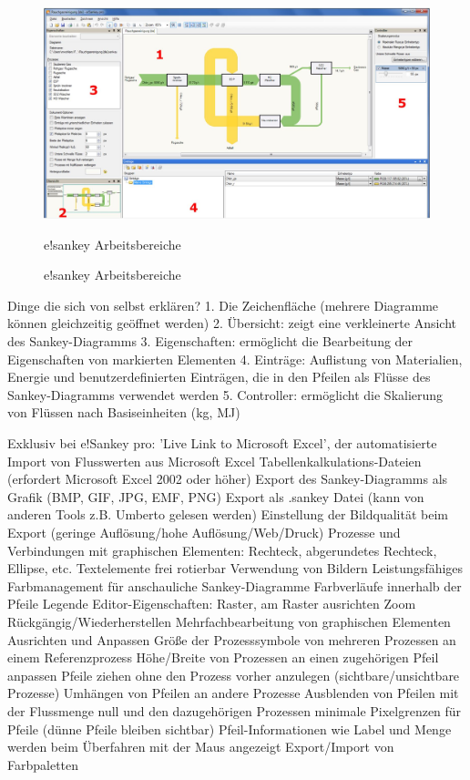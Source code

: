 \documentclass[a4paper, 12pt, twoside, BCOR=20mm, DIV=calc, abstracton, parskip=half*, toc=bibliography, toc=listof, headsepline, footsepline, headings=small, numbers=enddot]{scrreprt}
\begin{document}
\begin{figure}
\includegraphics{Bild/Esankey Arbeitsbereiche Rauchgas.JPG}
\caption{e!sankey Arbeitsbereiche}{e!sankey Arbeitsbereiche\cite{esankeyHandbuch032014}}
\end{figure}
Dinge die sich von selbst erklären?
	1. Die Zeichenfläche (mehrere Diagramme können gleichzeitig geöffnet werden) 
	2. Übersicht: zeigt eine verkleinerte Ansicht des Sankey-Diagramms 
	3. Eigenschaften: ermöglicht die Bearbeitung der Eigenschaften von markierten
	Elementen 
	4. Einträge: Auflistung von Materialien, Energie und benutzerdefinierten Einträgen,
	die in den Pfeilen als Flüsse des Sankey-Diagramms verwendet werden 
	5. Controller: ermöglicht die Skalierung von Flüssen nach Basiseinheiten (kg, MJ) 
	
	Exklusiv bei e!Sankey pro: 'Live Link to Microsoft Excel', der automatisierte Import von Flusswerten aus Microsoft Excel Tabellenkalkulations-Dateien (erfordert Microsoft Excel 2002 oder höher)
	Export des Sankey-Diagramms als Grafik (BMP, GIF, JPG, EMF, PNG)
	Export als .sankey Datei (kann von anderen Tools z.B. Umberto gelesen werden)
	Einstellung der Bildqualität beim Export (geringe Auflösung/hohe Auflösung/Web/Druck)
	Prozesse und Verbindungen mit graphischen Elementen: Rechteck, abgerundetes Rechteck, Ellipse, etc.
	Textelemente frei rotierbar
	Verwendung von Bildern
	Leistungsfähiges Farbmanagement für anschauliche Sankey-Diagramme
	Farbverläufe innerhalb der Pfeile
	Legende
	Editor-Eigenschaften: Raster, am Raster ausrichten
	Zoom
	Rückgängig/Wiederherstellen
	Mehrfachbearbeitung von graphischen Elementen
	Ausrichten und Anpassen Größe der Prozesssymbole von mehreren Prozessen an einem Referenzprozess
	Höhe/Breite von Prozessen an einen zugehörigen Pfeil anpassen
	Pfeile ziehen ohne den Prozess vorher anzulegen (sichtbare/unsichtbare Prozesse)
	Umhängen von Pfeilen an andere Prozesse
	Ausblenden von Pfeilen mit der Flussmenge null und den dazugehörigen Prozessen
	minimale Pixelgrenzen für Pfeile (dünne Pfeile bleiben sichtbar)
	Pfeil-Informationen wie Label und Menge werden beim Überfahren mit der Maus angezeigt
	Export/Import von Farbpaletten
\end{document}
